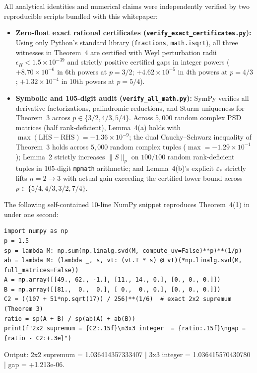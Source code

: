 \documentclass[10pt,letterpaper]{article}
\begin{document}
All analytical identities and numerical claims were independently verified by two reproducible scripts bundled with this whitepaper:
\begin{itemize}[leftmargin=1.5em,itemsep=2pt]
  \item \textbf{Zero-float exact rational certificates (\texttt{verify\_exact\_certificates.py}):} Using only Python's standard library (\texttt{fractions}, \texttt{math.isqrt}), all three witnesses in Theorem~4 are certified with Weyl perturbation radii $\epsilon_H < 1.5\times 10^{-39}$ and strictly positive certified gaps in integer powers ($+8.70\times 10^{-6}$ in 6th powers at $p = 3/2$; $+4.62\times 10^{-5}$ in 4th powers at $p = 4/3$; $+1.32\times 10^{-4}$ in 10th powers at $p = 5/4$).
  \item \textbf{Symbolic and 105-digit audit (\texttt{verify\_all\_math.py}):} SymPy verifies all derivative factorizations, palindromic reductions, and Sturm uniqueness for Theorem~3 across $p \in \{3/2, 4/3, 5/4\}$. Across $5{,}000$ random complex PSD matrices (half rank-deficient), Lemma~4(a) holds with $\max(\mathrm{LHS}-\mathrm{RHS}) = -1.36\times 10^{-9}$; the dual Cauchy--Schwarz inequality of Theorem~3 holds across $5{,}000$ random complex tuples ($\max = -1.29\times 10^{-1}$); Lemma~2 strictly increases $\|S\|_p$ on $100/100$ random rank-deficient tuples in 105-digit \texttt{mpmath} arithmetic; and Lemma~4(b)'s explicit $\varepsilon_*$ strictly lifts $n = 2 \to 3$ with actual gain exceeding the certified lower bound across $p \in \{5/4, 4/3, 3/2, 7/4\}$.
\end{itemize}

\clearpage
The following self-contained 10-line NumPy snippet reproduces Theorem~4(1) in under one second:
\begin{tcolorbox}[codebox]
\begin{lstlisting}
import numpy as np
p = 1.5
sp = lambda M: np.sum(np.linalg.svd(M, compute_uv=False)**p)**(1/p)
ab = lambda M: (lambda _, s, vt: (vt.T * s) @ vt)(*np.linalg.svd(M, full_matrices=False))
A = np.array([[49., 62., -1.], [11., 14., 0.], [0., 0., 0.]])
B = np.array([[81.,  0.,  0.], [ 0.,  0., 0.], [0., 0., 0.]])
C2 = ((107 + 51*np.sqrt(17)) / 256)**(1/6)  # exact 2x2 supremum (Theorem 3)
ratio = sp(A + B) / sp(ab(A) + ab(B))
print(f"2x2 supremum = {C2:.15f}\n3x3 integer  = {ratio:.15f}\ngap = {ratio - C2:+.3e}")
\end{lstlisting}
\end{tcolorbox}
\vspace{-2pt}
{\ttfamily\footnotesize\color{ink} Output: 2x2 supremum = 1.036414357333407 \;|\; 3x3 integer = 1.036415570430780 \;|\; gap = +1.213e-06.}
\end{document}
